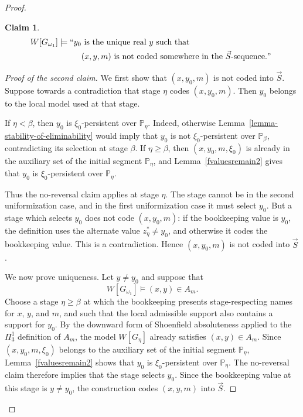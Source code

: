 \documentclass[a4paper,11pt]{article}
\newtheorem*{claim}{Claim}
\newcommand{\forceP}{\mathbb{P}}
\begin{document}
\begin{proof}
\par \medskip

\begin{claim}
\begin{align*}
 W[G_{\omega_1}] \models``y_0 & \text{ is the unique real $y$ such that }  \\& (x,y,m) \text{ is not coded somewhere in the $\vec{S}$-sequence.$"$ }
\end{align*}
\end{claim}
\begin{proof}[Proof of the second claim]
We first show that $(x,y_0,m)$ is not coded into $\vec S$.  Suppose towards a
contradiction that stage $\eta$ codes $(x,y_0,m)$.  Then $y_0$ belongs to
the local model used at that stage.

If $\eta<\beta$, then $y_0$ is $\xi_0$-persistent over $\forceP_\eta$.
Indeed, otherwise Lemma~\ref{lemma-stability-of-eliminability} would imply
that $y_0$ is not $\xi_0$-persistent over $\forceP_\beta$, contradicting
its selection at stage $\beta$.  If $\eta\geq\beta$, then
$(x,y_0,m,\xi_0)$ is already in the auxiliary set of the initial segment
$\forceP_\eta$, and Lemma~\ref{fvaluesremain2} gives that $y_0$ is
$\xi_0$-persistent over $\forceP_\eta$.

Thus the no-reversal claim applies at stage $\eta$.  The stage cannot be in
the second uniformization case, and in the first uniformization case it must
select $y_0$.  But a stage which selects $y_0$ does not code $(x,y_0,m)$: if
the bookkeeping value is $y_0$, the definition uses the alternate value
$z_\eta^*\neq y_0$, and otherwise it codes the bookkeeping value.  This is a
contradiction.  Hence $(x,y_0,m)$ is not coded into $\vec S$.

We now prove uniqueness.  Let $y\neq y_0$ and suppose that
\[
   W[G_{\omega_1}]\models (x,y)\in A_m.
\]
Choose a stage $\eta\geq\beta$ at which the bookkeeping presents
stage-respecting names for $x$, $y$, and $m$, and such that the local
admissible support also contains a support for $y_0$.  By the downward form of
Shoenfield absoluteness applied to the $\Pi^1_3$ definition of $A_m$, the
model $W[G_\eta]$ already satisfies $(x,y)\in A_m$.  Since
$(x,y_0,m,\xi_0)$ belongs to the auxiliary set of the initial segment
$\forceP_\eta$, Lemma~\ref{fvaluesremain2} shows that $y_0$ is
$\xi_0$-persistent over $\forceP_\eta$.  The no-reversal claim therefore
implies that the stage selects $y_0$.  Since the bookkeeping value at this
stage is $y\neq y_0$, the construction codes $(x,y,m)$ into $\vec S$.


\end{proof}
\end{proof}
\end{document}
